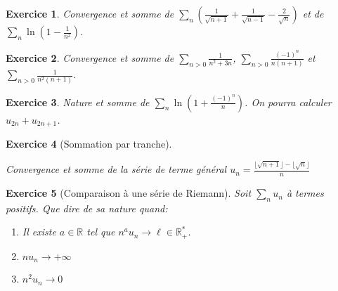 \documentclass[12pt,a4paper]{article}
\newcommand{\R}{\mathbb{R}}
\theoremstyle{break}
\newtheorem{Exo}{Exercice}
\begin{document}
\begin{Exo}
	Convergence et somme de $\sum_n\left(\frac{1}{\sqrt{n+1}}+\frac{1}{\sqrt{n-1}}-\frac{2}{\sqrt{n}}\right)$ et de $\sum_n \ln\left(1-\frac{1}{n^2}\right)$.
\end{Exo}


\begin{Exo}
	 Convergence et somme de $\sum_{n>0}\frac{1}{n^2+3n}$, $\sum_{n>0}\frac{(-1)^n}{n(n+1)}$ et $\sum_{n>0}\frac{1}{n^2(n+1)}$.
\end{Exo}

%


\begin{Exo}
	Nature et somme de $\sum_n \ln\left(1+\frac{(-1)^n}{n}\right)$. On pourra calculer $u_{2n}+u_{2n+1}$.
\end{Exo}



\begin{Exo}[Sommation par tranche]
	\ 
	
	Convergence et somme de la série de terme général $u_n=\frac{\lfloor \sqrt{n+1}\rfloor-\lfloor \sqrt{n}\rfloor }{n}$
\end{Exo}

\begin{Exo}[Comparaison à une série de Riemann]
	Soit $\sum_n u_n$ à termes positifs. Que dire de sa nature quand:
	\begin{enumerate}
		\item
		Il existe $a\in \R$ tel que $n^au_n\to \ell\in \R_+^*$.
		\item 
		$nu_n\to +\infty$
		\item 
		$n^2u_n\to 0$
	\end{enumerate}
\end{Exo}
\end{document}
